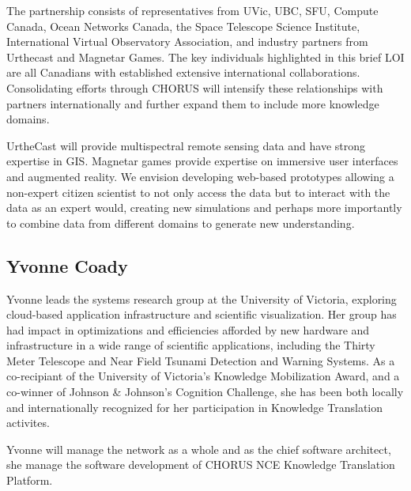 

The partnership consists of representatives from UVic, UBC, SFU,
Compute Canada, Ocean Networks Canada, the Space Telescope Science
Institute, International Virtual Observatory Association, and industry
partners from Urthecast and Magnetar Games.  The key individuals
highlighted in this brief LOI are all Canadians with established
extensive international collaborations.  Consolidating efforts through
CHORUS will intensify these relationships with partners
internationally and further expand them to include more knowledge
domains.

UrtheCast will provide multispectral remote sensing data and have
strong expertise in GIS.  Magnetar games provide expertise on
immersive user interfaces and augmented reality.  We envision
developing web-based prototypes allowing a non-expert citizen
scientist to not only access the data but to interact with the data as
an expert would, creating new simulations and perhaps more importantly
to combine data from different domains to generate new understanding.

\subsection*{Yvonne Coady} 

Yvonne leads the systems research group at the University of Victoria,
exploring cloud-based application infrastructure and scientific
visualization.  Her group has had impact in optimizations and
efficiencies afforded by new hardware and infrastructure in a wide
range of scientific applications, including the Thirty Meter Telescope
and Near Field Tsunami Detection and Warning Systems.  As a
co-recipiant of the University of Victoria's Knowledge Mobilization
Award, and a co-winner of Johnson \& Johnson's Cognition Challenge, she
has been both locally and internationally recognized for her
participation in Knowledge Translation activites.

Yvonne will manage the network as a whole and as the chief software
architect, she manage the software development of CHORUS NCE Knowledge
Translation Platform.



